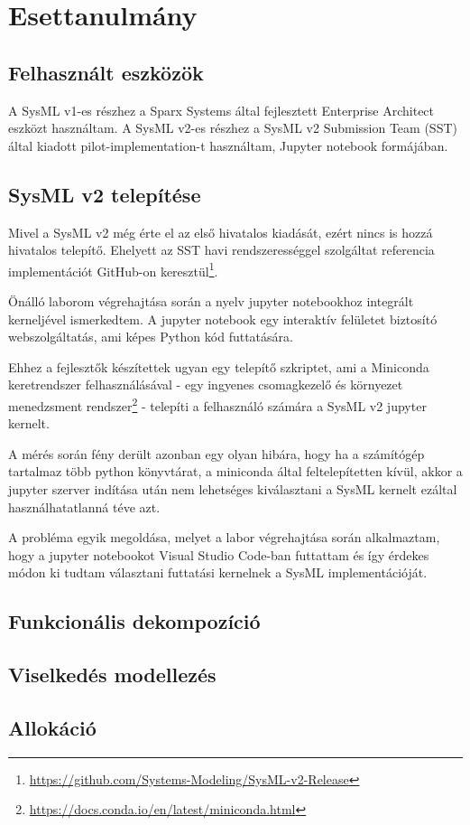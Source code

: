 \chapter{Esettanulmány}
\section{Felhasznált eszközök}
A SysML v1-es részhez a Sparx Systems által fejlesztett Enterprise Architect eszközt használtam.
A SysML v2-es részhez a SysML v2 Submission Team (SST) által kiadott pilot-implementation-t használtam, Jupyter notebook formájában.

\section{SysML v2 telepítése}
Mivel a SysML v2 még érte el az első hivatalos kiadását, ezért nincs is hozzá hivatalos telepítő.
Ehelyett az SST havi rendszerességgel szolgáltat referencia implementációt GitHub-on keresztül\footnote{\url{https://github.com/Systems-Modeling/SysML-v2-Release}}.

Önálló laborom végrehajtása során a nyelv jupyter notebookhoz integrált kerneljével ismerkedtem.
A jupyter notebook egy interaktív felületet biztosító webszolgáltatás, ami képes Python kód futtatására.

Ehhez a fejlesztők készítettek ugyan egy telepítő szkriptet, ami a Miniconda keretrendszer felhasználásával - egy ingyenes csomagkezelő és környezet menedzsment rendszer\footnote{\url{https://docs.conda.io/en/latest/miniconda.html}} - telepíti a felhasználó számára a SysML v2 jupyter kernelt.

A mérés során fény derült azonban egy olyan hibára, hogy ha a számítógép tartalmaz több python könyvtárat, a miniconda által feltelepítetten kívül, akkor a jupyter szerver indítása után nem lehetséges kiválasztani a SysML kernelt ezáltal használhatatlanná téve azt.

A probléma egyik megoldása, melyet a labor végrehajtása során alkalmaztam, hogy a jupyter notebookot Visual Studio Code-ban futtattam és így érdekes módon ki tudtam választani futtatási kernelnek a SysML implementációját.

\section{Funkcionális dekompozíció}

\section{Viselkedés modellezés}

\section{Allokáció}